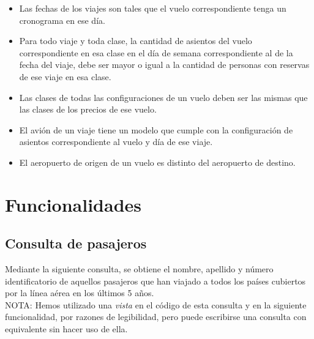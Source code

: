 \documentclass[a4paper,10pt]{article}
\begin{document}
\begin{itemize}

  \item Las fechas de los viajes son tales que el vuelo correspondiente tenga un cronograma en ese día.

  \item Para todo viaje y toda clase, la cantidad de asientos del vuelo correspondiente en esa clase en el día de semana correspondiente al de la fecha del viaje, debe ser mayor o igual a la cantidad de personas con reservas de ese viaje en esa clase.

  \item Las clases de todas las configuraciones de un vuelo deben ser las mismas que las clases de los precios de ese vuelo.

  \item El avión de un viaje tiene un modelo que cumple con la configuración de asientos correspondiente al vuelo y día de ese viaje.

  \item El aeropuerto de origen de un vuelo es distinto del aeropuerto de destino.

\end{itemize}

\newpage
\section{Funcionalidades}


\subsection{Consulta de pasajeros}

Mediante la siguiente consulta, se obtiene el nombre, apellido y número identificatorio de aquellos pasajeros que han viajado a todos los países cubiertos por la línea aérea en los
últimos 5 años.\\

NOTA: Hemos utilizado una \textit{vista} en el código de esta consulta y en la siguiente funcionalidad, por razones de legibilidad, pero puede escribirse una consulta con equivalente sin hacer uso de ella.
\end{document}
